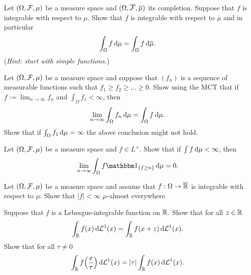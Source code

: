 \begin{problem}
    Let $(\Omega,\mathcal F,\mu)$ be a measure space and  $(\Omega,\overline{\mathcal F},\overline{\mu})$ its completion. Suppose that $f$ is integrable with respect to $\mu$. Show that $f$ is integrable with respect to $\overline{\mu}$ and in particular 
    \begin{equation*}
        \int_{\Omega} f\,\mathrm{d} \mu =  \int_{\Omega} f\,\mathrm{d} \overline{\mu}.
    \end{equation*}
    (\emph{Hint: start with simple functions.})
\end{problem}

\begin{problem} Let $(\Omega,\mathcal F,\mu)$ be a measure space and suppose that $(f_{n})$ is a sequence of measurable functions such that $f_1\geq f_2\geq\ldots \geq 0$. Show using the MCT that if $f :=\lim_{n\to\infty} f_n$ and $\int_{\Omega} f_1<\infty$, then
\begin{equation*}
    \lim_{n\to\infty} \int_\Omega f_n\,\mathrm{d} \mu =  \int_\Omega f\,\mathrm{d} \mu.
\end{equation*}
Show that if $\int_{\Omega} f_1\,\mathrm{d} \mu = \infty$ the above conclusion might not hold.    
\end{problem}

\begin{problem}
    Let $(\Omega,\mathcal F,\mu)$ be a measure space and $f\in L^+$. Show that if $\int f\,\mathrm{d} \mu <\infty$, then
    \begin{equation*}
        \lim_{n\to\infty} \int_\Omega f \ind{f\geq n} \,\De \mu = 0. 
    \end{equation*}
\end{problem}

\begin{problem} Let $(\Omega,\mathcal F,\mu)$ be a measure space and assume that $f:\Omega\to \overline{\mathbb R}$ is integrable with respect to $\mu$. Show that $|f|<\infty$ $\mu$-almost everywhere.
    
\end{problem}

\begin{problem} Suppose that $f$ is a Lebesgue-integrable function on $\mathbb R$. Show that for all $z\in \mathbb R$
    \begin{equation*}
        \int_{\mathbb R} f(x)\,\mathrm{d} \mathcal L^1(x) = \int_{\mathbb R} f(x+z)\,\mathrm{d} \mathcal L^1(x).
    \end{equation*}
Show that for all $\tau \neq 0$
\begin{equation*}
    \int_{\mathbb R} f\Big(\frac{x}{\tau}\Big)\,\mathrm{d} \mathcal L^1(x) = |\tau| \int_{\mathbb R} f(x)\,\mathrm{d} \mathcal L^1(x).
\end{equation*}
\end{problem}

